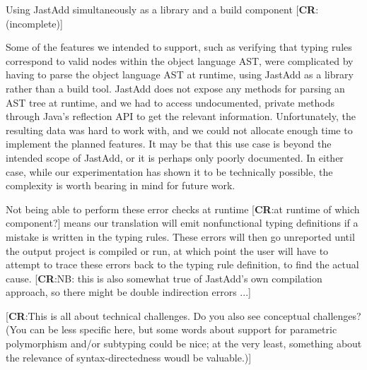 \documentclass[nofilelist]{cslthse-msc}
\newcommand{\CR}[1]{\textcolor{green!60!black}{[\textbf{CR}:#1]}}
\begin{document}
Using JastAdd simultaneously as a library and a build component
\CR{(incomplete)}

Some of the features we intended to support, such as verifying that typing rules correspond to valid nodes within the object language AST, were complicated by having to parse the object language AST at runtime, using JastAdd as a library rather than a build tool.
JastAdd does not expose any methods for parsing an AST tree at runtime, and we had to access undocumented, private methods through Java's reflection API to get the relevant information.
Unfortunately, the resulting data was hard to work with, and we could not allocate enough time to implement the planned features.
It may be that this use case is beyond the intended scope of JastAdd, or it is perhaps only poorly documented.
In either case, while our experimentation has shown it to be technically possible, the complexity is worth bearing in mind for future work.

Not being able to perform these error checks at runtime
\CR{at runtime of which component?}
means our translation will emit nonfunctional typing definitions if a mistake is written in the typing rules.
These errors will then go unreported until the output project is compiled or run, at which point the user will have to attempt to trace these errors back to the typing rule definition, to find the actual cause.
\CR{NB: this is also somewhat true of JastAdd's own compilation approach, so there might be double indirection errors ...}

\CR{This is all about technical challenges.  Do you also see conceptual challenges?  (You can be less specific here, but
  some words about support for parametric polymorphism and/or subtyping could be nice; at the very least, something
  about the relevance of syntax-directedness woudl be valuable.)}
\end{document}
